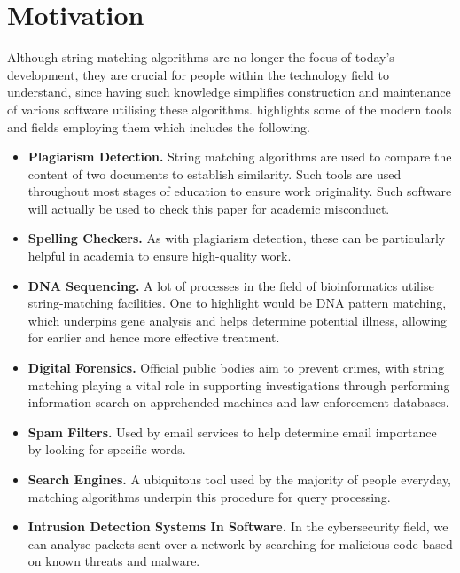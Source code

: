 \section{Motivation}


Although string matching algorithms are no longer the focus of today's development,  they are crucial for people within the technology field to understand, since having such knowledge simplifies construction and maintenance of various software utilising these algorithms. \cite{GeeksforGeeks_2022} highlights some of the modern tools and fields employing them which includes the following. 
%
\begin{itemize}
  \item
  \textbf{Plagiarism Detection.} String matching algorithms are used to compare the content of two documents to establish similarity. Such tools are used throughout most stages of education to ensure work originality. Such software will actually be used to check this paper for academic misconduct. 
  \item
  \textbf{Spelling Checkers.} As with plagiarism detection, these can be particularly helpful in academia to ensure high-quality work.  
  \item
  \textbf{DNA Sequencing.} A lot of processes in the field of bioinformatics utilise string-matching facilities. One to highlight would be DNA pattern matching, which underpins gene analysis and helps determine potential illness, allowing for earlier and hence more effective treatment.
  \item
  \textbf{Digital Forensics.} Official public bodies aim to prevent crimes, with string matching playing a vital role in supporting investigations through performing information search on apprehended machines and law enforcement databases.
  \item
  \textbf{Spam Filters.} Used by email services to help determine email importance by looking for specific words.
  \item
  \textbf{Search Engines.} A ubiquitous tool used by the majority of people everyday, matching algorithms underpin this procedure for query processing.
  \item
  \textbf{Intrusion Detection Systems In Software.} In the cybersecurity field, we can analyse packets sent over a network by searching for malicious code based on known threats and malware.
\end{itemize}

